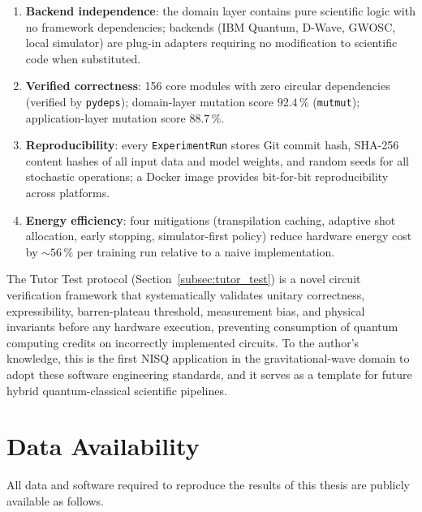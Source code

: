 \documentclass[11pt,a4paper, english]{book}
\theoremstyle{plain}
\theoremstyle{definition}
\numberwithin{equation}{chapter}
\numberwithin{figure}{chapter}
\numberwithin{table}{chapter}
\begin{document}
\begin{enumerate}
  \item \textbf{Backend independence}: the domain layer contains pure
        scientific logic with no framework dependencies; backends (IBM
        Quantum, D-Wave, GWOSC, local simulator) are plug-in adapters
        requiring no modification to scientific code when substituted.

  \item \textbf{Verified correctness}: 156 core modules with zero
        circular dependencies (verified by \texttt{pydeps}); domain-layer
        mutation score $92.4\,\%$ (\texttt{mutmut}); application-layer
        mutation score $88.7\,\%$.

  \item \textbf{Reproducibility}: every \texttt{ExperimentRun} stores Git
        commit hash, SHA-256 content hashes of all input data and model
        weights, and random seeds for all stochastic operations; a Docker
        image provides bit-for-bit reproducibility across platforms.

  \item \textbf{Energy efficiency}: four mitigations (transpilation
        caching, adaptive shot allocation, early stopping, simulator-first
        policy) reduce hardware energy cost by $\sim\!56\,\%$ per training
        run relative to a naive implementation.
\end{enumerate}

The Tutor Test protocol (Section~\ref{subsec:tutor_test}) is a novel
circuit verification framework that systematically validates unitary
correctness, expressibility, barren-plateau threshold, measurement bias,
and physical invariants before any hardware execution, preventing
consumption of quantum computing credits on incorrectly implemented
circuits.  To the author's knowledge, this is the first NISQ application
in the gravitational-wave domain to adopt these software engineering
standards, and it serves as a template for future hybrid quantum-classical
scientific pipelines.
\chapter{Data Availability}
\label{app:data-availability}
All data and software required to reproduce the results of this thesis 
are publicly available as follows.
\end{document}
